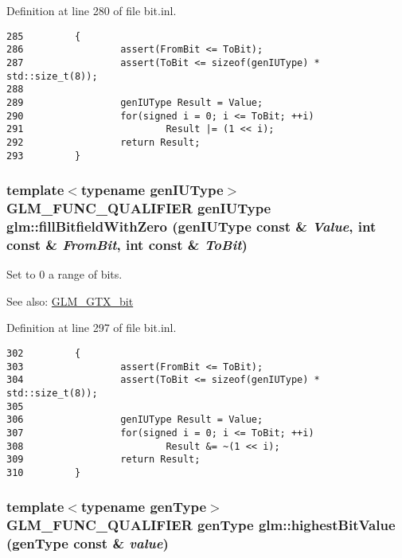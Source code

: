 Definition at line 280 of file bit.inl.

\begin{Code}\begin{verbatim}285         {
286                 assert(FromBit <= ToBit);
287                 assert(ToBit <= sizeof(genIUType) * std::size_t(8));
288 
289                 genIUType Result = Value;
290                 for(signed i = 0; i <= ToBit; ++i)
291                         Result |= (1 << i);
292                 return Result;
293         }
\end{verbatim}
\end{Code}


\hypertarget{group__gtx__bit_gd7bf903dae07525ab89be5a3cad616a7}{
\subsubsection[fillBitfieldWithZero]{\setlength{\rightskip}{0pt plus 5cm}template$<$typename genIUType$>$ GLM\_\-FUNC\_\-QUALIFIER genIUType glm::fillBitfieldWithZero (genIUType const \& {\em Value}, \/  int const \& {\em FromBit}, \/  int const \& {\em ToBit})}}
\label{group__gtx__bit_gd7bf903dae07525ab89be5a3cad616a7}


Set to 0 a range of bits. \begin{Desc}
\item[See also:]\hyperlink{group__gtx__bit}{GLM\_\-GTX\_\-bit} \end{Desc}


Definition at line 297 of file bit.inl.

\begin{Code}\begin{verbatim}302         {
303                 assert(FromBit <= ToBit);
304                 assert(ToBit <= sizeof(genIUType) * std::size_t(8));
305 
306                 genIUType Result = Value;
307                 for(signed i = 0; i <= ToBit; ++i)
308                         Result &= ~(1 << i);
309                 return Result;
310         }
\end{verbatim}
\end{Code}


\hypertarget{group__gtx__bit_gda4310fc2dd8db30392da133067ed13e}{
\subsubsection[highestBitValue]{\setlength{\rightskip}{0pt plus 5cm}template$<$typename genType$>$ GLM\_\-FUNC\_\-QUALIFIER genType glm::highestBitValue (genType const \& {\em value})}}
\label{group__gtx__bit_gda4310fc2dd8db30392da133067ed13e}


